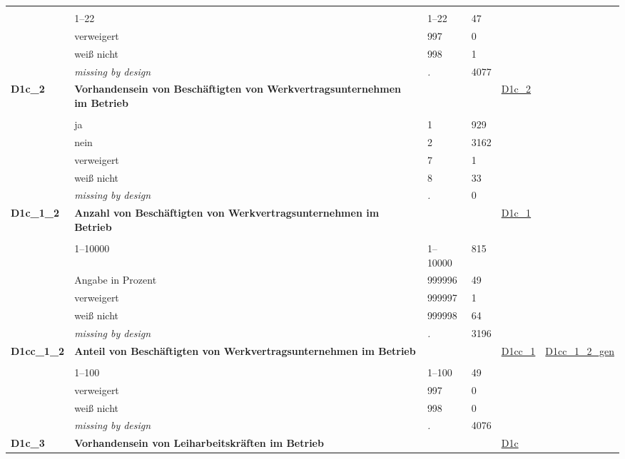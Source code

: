 \begin{longtable}{| L{2.45cm} | L{6cm} | C{1.5cm} | R{1cm} | C{2.25cm} | C{2.25cm} |}
   &  &  &  &  &  \\ 
   & 1--22 & 1--22 & 47 &  &  \\ 
   & verweigert & 997 & 0 &  &  \\ 
   & weiß nicht & 998 & 1 &  &  \\ 
   & \textit{missing by design} & \textit{.} & 4077 &  &  \\ 
   \midrule
\textbf{D1c\_2}\label{var:D1c:2} & \textbf{Vorhandensein von Beschäftigten von Werkvertragsunternehmen im Betrieb} &  &  & \hyperref[D1c:2]{D1c\_2} & \hyperref[var:suf:]{} \\ 
   &  &  &  &  &  \\ 
   & ja & 1 & 929 &  &  \\ 
   & nein & 2 & 3162 &  &  \\ 
   & verweigert & 7 & 1 &  &  \\ 
   & weiß nicht & 8 & 33 &  &  \\ 
   & \textit{missing by design} & \textit{.} & 0 &  &  \\ 
   \midrule
\textbf{D1c\_1\_2}\label{var:D1c:1:2} & \textbf{Anzahl von Beschäftigten von Werkvertragsunternehmen im Betrieb} &  &  & \hyperref[D1c:1]{D1c\_1} & \hyperref[var:suf:]{} \\ 
   &  &  &  &  &  \\ 
   & 1--10000 & 1--10000 & 815 &  &  \\ 
   & Angabe in Prozent & 999996 & 49 &  &  \\ 
   & verweigert & 999997 & 1 &  &  \\ 
   & weiß nicht & 999998 & 64 &  &  \\ 
   & \textit{missing by design} & \textit{.} & 3196 &  &  \\ 
   \midrule
\textbf{D1cc\_1\_2}\label{var:D1cc:1:2} & \textbf{Anteil von Beschäftigten von Werkvertragsunternehmen im Betrieb} &  &  & \hyperref[D1cc:1]{D1cc\_1} & \hyperref[var:suf:D1cc:1:2:gen]{D1cc\_1\_2\_gen} \\ 
   &  &  &  &  &  \\ 
   & 1--100 & 1--100 & 49 &  &  \\ 
   & verweigert & 997 & 0 &  &  \\ 
   & weiß nicht & 998 & 0 &  &  \\ 
   & \textit{missing by design} & \textit{.} & 4076 &  &  \\ 
   \midrule
\textbf{D1c\_3}\label{var:D1c:3} & \textbf{Vorhandensein von Leiharbeitskräften im Betrieb} &  &  & \hyperref[D1c]{D1c} & \hyperref[var:suf:]{} \\ 

\end{longtable}
